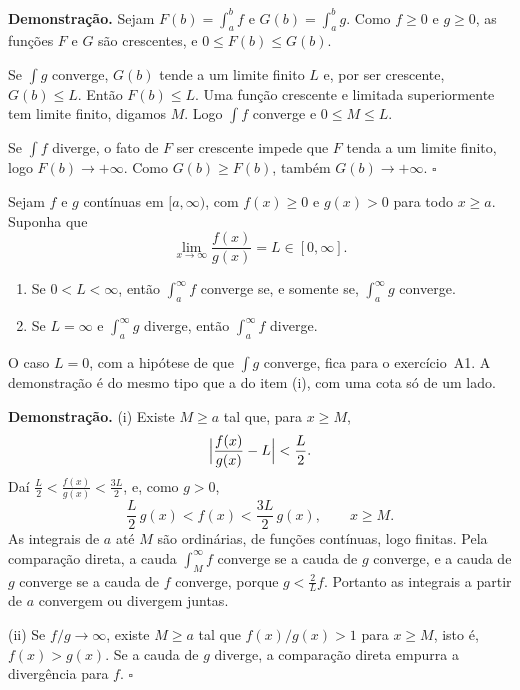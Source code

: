 \documentclass[11pt,a4paper]{article}
\begin{document}
\noindent\textbf{Demonstração.}
Sejam \(F(b)=\int_a^{b} f\) e \(G(b)=\int_a^{b} g\). Como \(f\ge 0\) e \(g\ge 0\), as funções \(F\) e \(G\) são crescentes, e \(0\le F(b)\le G(b)\).

Se \(\int g\) converge, \(G(b)\) tende a um limite finito \(L\) e, por ser crescente, \(G(b)\le L\). Então \(F(b)\le L\). Uma função crescente e limitada superiormente tem limite finito, digamos \(M\). Logo \(\int f\) converge e \(0\le M\le L\).

Se \(\int f\) diverge, o fato de \(F\) ser crescente impede que \(F\) tenda a um limite finito, logo \(F(b)\to+\infty\). Como \(G(b)\ge F(b)\), também \(G(b)\to+\infty\).
\hfill\(\square\)

\begin{teorema}
Sejam \(f\) e \(g\) contínuas em \([a,\infty)\), com \(f(x)\ge 0\) e \(g(x)>0\) para todo \(x\ge a\). Suponha que
\[
\lim_{x\to\infty}\frac{f(x)}{g(x)}=L\in[0,\infty].
\]
\begin{enumerate}
\item Se \(0<L<\infty\), então \(\int_a^{\infty} f\) converge se, e somente se, \(\int_a^{\infty} g\) converge.
\item Se \(L=\infty\) e \(\int_a^{\infty} g\) diverge, então \(\int_a^{\infty} f\) diverge.
\end{enumerate}
O caso \(L=0\), com a hipótese de que \(\int g\) converge, fica para o exercício~A1. A demonstração é do mesmo tipo que a do item (i), com uma cota só de um lado.
\end{teorema}

\noindent\textbf{Demonstração.}
(i) Existe \(M\ge a\) tal que, para \(x\ge M\),
\[
\Bigl\lvert\frac{f(x)}{g(x)}-L\Bigr\rvert<\frac{L}{2}.
\]
Daí \(\frac{L}{2}<\frac{f(x)}{g(x)}<\frac{3L}{2}\), e, como \(g>0\),
\[
\frac{L}{2}\,g(x)<f(x)<\frac{3L}{2}\,g(x),\qquad x\ge M.
\]
As integrais de \(a\) até \(M\) são ordinárias, de funções contínuas, logo finitas. Pela comparação direta, a cauda \(\int_M^{\infty} f\) converge se a cauda de \(g\) converge, e a cauda de \(g\) converge se a cauda de \(f\) converge, porque \(g<\frac{2}{L}f\). Portanto as integrais a partir de \(a\) convergem ou divergem juntas.

(ii) Se \(f/g\to\infty\), existe \(M\ge a\) tal que \(f(x)/g(x)>1\) para \(x\ge M\), isto é, \(f(x)>g(x)\). Se a cauda de \(g\) diverge, a comparação direta empurra a divergência para \(f\).
\hfill\(\square\)

\end{document}
